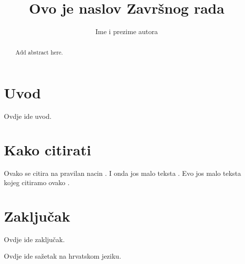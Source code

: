 \documentclass[times, utf8, zavrsni, numeric]{templates/template}
\begin{document}

\title{Ovo je naslov Završnog rada}


\author{Ime i prezime autora}

\maketitle

\izvornik


\tableofcontents

\chapter{Uvod}
Ovdje ide uvod.

\chapter{Kako citirati}
Ovako se citira na pravilan nacin \cite{oetiket2007lshort}. I onda jos malo teksta \cite{downes2002shortams}. 
Evo jos malo teksta kojeg citiramo ovako \cite{ungar2002uvod}.

\chapter{Zaključak}
Ovdje ide zaključak.




\begin{sazetak}
Ovdje ide sažetak na hrvatskom jeziku.

\end{sazetak}

\begin{abstract}
Add abstract here.

\end{abstract}
\end{document}
